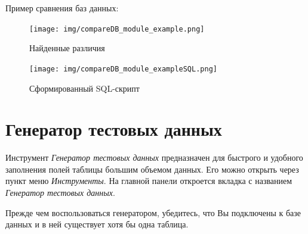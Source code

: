 Пример сравнения баз данных:
\begin{figure}[H]
	\centering
	\texttt{[image: img/compareDB\_module\_example.png]}
	\caption{Найденные различия}
\end{figure}

\begin{figure}[H]
	\centering
	\texttt{[image: img/compareDB\_module\_exampleSQL.png]}
	\caption{Сформированный SQL-скрипт}
\end{figure}

\newpage

\section{Генератор тестовых данных}\label{sec:test_data_generator}

Инструмент \textit{Генератор тестовых данных} предназначен для быстрого и удобного заполнения полей таблицы большим объемом данных. Его можно открыть через пункт меню \textit{Инструменты}.
На главной панели откроется вкладка с названием \textit{Генератор тестовых данных}. 

Прежде чем воспользоваться генератором, убедитесь, что Вы подключены к базе данных и в ней существует хотя бы одна таблица.  

